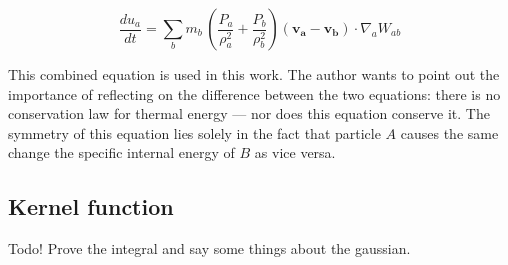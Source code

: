 \documentclass[../main.tex]{subfiles}
\begin{document}
\begin{equation}
    \frac{du_a}{dt}
    = \sum_b m_b \, (\frac{P_a}{\rho_a^2} + \frac{P_b}{\rho_b^2}) (\bm{v_a} - \bm{v_b}) \cdot
    \nabla_a W_{ab}
\end{equation}

This combined equation is used in this work. The author wants to point out the importance of
reflecting on the difference between the two equations: there is no conservation law for thermal
energy --- nor does this equation conserve it. The symmetry of this equation lies solely in the fact
that particle $A$ causes the same change the specific internal energy of $B$ as vice versa.

\subsection{Kernel function}

Todo! Prove the integral and say some things about the gaussian.
\end{document}
